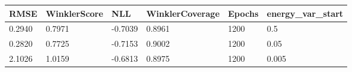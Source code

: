 \begin{tabular}{llllll}
\toprule
RMSE & WinklerScore & NLL & WinklerCoverage & Epochs & energy_var_start \\
\midrule
0.2940 & 0.7971 & -0.7039 & 0.8961 & 1200 & 0.5 \\
0.2820 & 0.7725 & -0.7153 & 0.9002 & 1200 & 0.05 \\
2.1026 & 1.0159 & -0.6813 & 0.8975 & 1200 & 0.005 \\
\bottomrule
\end{tabular}
